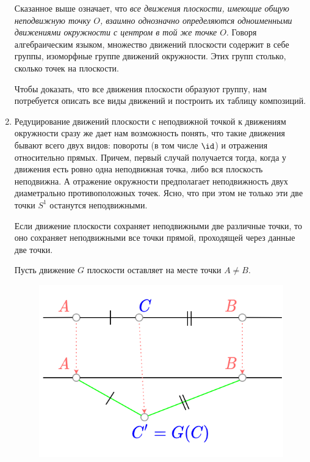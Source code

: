 \begin{enumerate}
Сказанное выше означает, что \textit{все движения плоскости, имеющие общую неподвижную точку $O$, взаимно однозначно определяются одноименными движениями окружности с центром в той же точке $O$}. Говоря алгебраическим языком, множество движений плоскости содержит в себе группы, изоморфные группе движений окружности. Этих групп столько, сколько точек на плоскости.

Чтобы доказать, что все движения плоскости образуют группу, нам потребуется описать все виды движений и построить их таблицу композиций.

\item Редуцирование движений плоскости с неподвижной точкой к движениям окружности сразу же дает нам возможность понять, что такие движения бывают всего двух видов: повороты (в том числе $\id$) и отражения относительно прямых. Причем, первый случай получается тогда, когда у движения есть ровно одна неподвижная точка, либо вся плоскость неподвижна. А отражение окружности предполагает неподвижность двух диаметрально противоположных точек. Ясно, что при этом не только эти две точки $S^1$ останутся неподвижными.
\begin{lem} Если движение плоскости сохраняет неподвижными две различные точки, то оно сохраняет неподвижными все точки прямой, проходящей через данные две точки.
\end{lem}
\pf Пусть движение $G$ плоскости оставляет на месте точки $A\ne B$.

\begin{figure}[htb!]
\begin{center}
\includegraphics[scale=0.3]{linestayhere.png}
\end{center}\caption{}\label{linestayhere}
\end{figure}


\end{enumerate}

